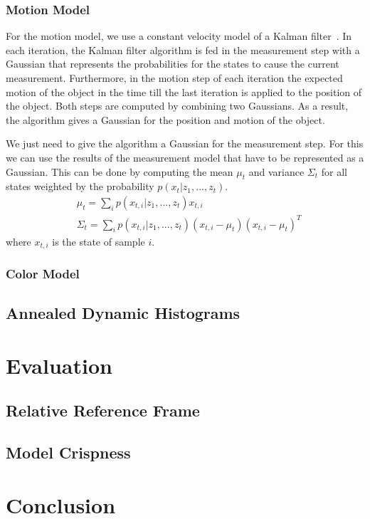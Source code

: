 \documentclass[twoside,a4paper,article]{combine}
\begin{document}
\subsubsection{Motion Model}
For the motion model, we use a constant velocity model of a Kalman
filter~\cite{prob-rob}. In each iteration, the Kalman filter algorithm
is fed in the measurement step with a Gaussian that represents the
probabilities for the states to cause the current
measurement. Furthermore, in the motion step of each iteration the
expected motion of the object in the time till the last iteration is
applied to the position of the object. Both steps are computed by
combining two Gaussians. As a result, the algorithm gives a Gaussian
for the position and motion of the object.

We just need to give the algorithm a Gaussian for the measurement
step. For this we can use the results of the measurement model that
have to be represented as a Gaussian. This can be done by computing
the mean $\mu_t$ and variance $\Sigma_t$ for all states weighted by
the probability $p(x_t|z_1,...,z_t)$.
\begin{align}
\label{eq:motion-model}
& \mu_t=\sum_i p(x_{t,i}|z_1,...,z_t)x_{t,i}\nonumber\\
& \Sigma_t=\sum_i p(x_{t,i}|z_1,...,z_t) (x_{t,i}-\mu_t)(x_{t,i}-\mu_t)^T\nonumber
\end{align}
where $x_{t,i}$ is the state of sample $i$.

\subsubsection{Color Model}

\subsection{Annealed Dynamic Histograms}
\label{sub:adh}

\section{Evaluation}
\label{sec:evaluation}
\subsection{Relative Reference Frame}
\label{sub:relative-ref-frame}
\subsection{Model Crispness}
\label{sub:model-crispness}

\section{Conclusion}
\label{sec:conclusion}





\end{document}
